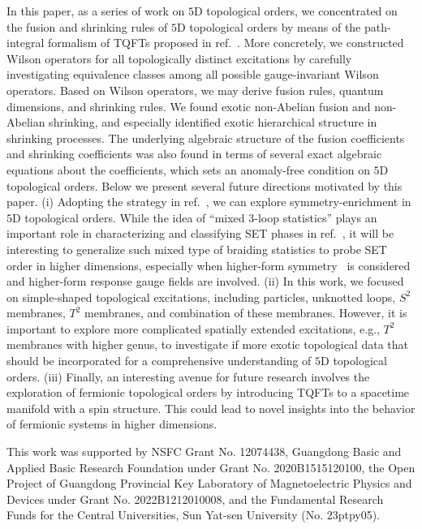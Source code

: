 \documentclass[11pt,nofootinbib,preprint]{revtex4-1}
\begin{document}
In this paper, as a series of work on $5$D topological orders, we   concentrated on the fusion and shrinking rules of $5$D topological orders by means of the path-integral formalism of TQFTs proposed in ref.~\cite{Zhang:2021ycl}. More concretely, we constructed Wilson operators for all topologically distinct excitations by carefully investigating equivalence classes among all possible gauge-invariant Wilson operators.  
Based on Wilson operators, we may derive fusion rules, quantum dimensions, and shrinking rules. We found exotic non-Abelian fusion and non-Abelian shrinking, and especially identified exotic hierarchical structure in shrinking processes.  The underlying algebraic structure of the fusion coefficients and shrinking coefficients was also found in terms of several exact algebraic equations about the coefficients, which sets an anomaly-free condition on $5$D topological orders.  Below we present several future directions motivated by this paper.  (i) Adopting the strategy in ref.~\cite{Ning2018prb}, we can explore symmetry-enrichment in $5$D topological orders. While the idea of ``mixed $3$-loop statistics'' plays an important role in characterizing and classifying SET phases in ref.~\cite{Ning2018prb}, it will be interesting to generalize such mixed type of braiding statistics to probe SET order in higher dimensions, especially when higher-form symmetry~\cite{mcgreevy2023} is considered and higher-form response gauge fields are involved.
(ii) In this work, we focused on simple-shaped topological excitations, including particles, unknotted loops, $S^2$ membranes, $T^2$ membranes, and combination of these membranes. However, it is important to explore more complicated spatially extended excitations, e.g., $T^2$ membranes with higher genus, to investigate if more exotic topological data that should be incorporated for a comprehensive understanding of $5$D topological orders. 
(iii) Finally, an interesting avenue for future research involves the exploration of fermionic topological orders by introducing TQFTs to a spacetime manifold with a spin structure. This could lead to novel insights into the behavior of fermionic systems in higher dimensions.
  

\acknowledgements
This work was supported by NSFC Grant No. 12074438, Guangdong Basic and Applied Basic Research Foundation under Grant No. 2020B1515120100, the Open Project of Guangdong Provincial Key Laboratory of Magnetoelectric Physics and Devices under Grant No. 2022B1212010008, and the Fundamental Research Funds for the Central Universities, Sun Yat-sen University (No. 23ptpy05).
\end{document}
